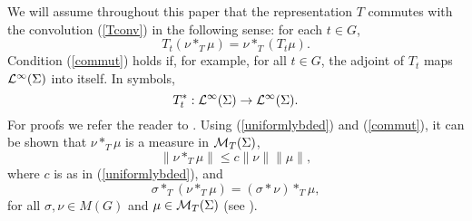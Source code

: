 \documentclass[12pt,leqno]{article}
\def\cL{{\cal L}}
\def\cMT{{\cal M}_T(\Sigma)}
\begin{document}
We will assume throughout this paper
that the representation $T$ commutes with the 
convolution (\ref{Tconv}) in the following sense:
 for each $t\in G$, 
\begin{equation} 
 T_t(\nu*_T\mu)=\nu*_T(T_t\mu).
\label{commut}
\end{equation}
Condition (\ref{commut}) holds if, for example,
for all $t\in G$, the adjoint of $T_t$ maps 
$\cL^\infty(\Sigma)$ into itself.  In symbols,
\begin{equation}
T_t^*: \cL^\infty(\Sigma) \rightarrow \cL^\infty(\Sigma).
\label{adjointT}
\end{equation}
For proofs we refer the reader to 
\cite{ams2}.  Using (\ref{uniformlybded}) and 
(\ref{commut}), it can be shown that $\nu*_T\mu$ is a measure in $\cMT$,
\begin{equation}
\|\nu*_T\mu\|\leq  c\|\nu\|\|\mu\|,
\label{normofconv}
\end{equation}
where $c$ is as in 
(\ref{uniformlybded}), and 
\begin{equation} 
\sigma*_T(\nu*_T\mu)=(\sigma*\nu)*_T\mu,
\label{associative}
\end{equation}
for all $\sigma , \nu \in M(G)$ and $\mu \in \cMT$
(see \cite{ams2}).
\end{document}
